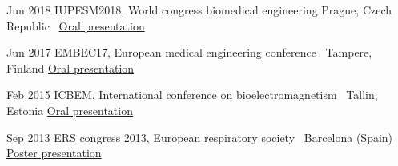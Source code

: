 \documentclass[letterpaper]{twentysecondcv} %
\begin{document}
\begin{twenty} %

	\twentyitem
    	{Jun 2018}
        {IUPESM2018, World congress biomedical engineering}
        {}
        {Prague, Czech Republic \hfill
          { \ \href{https://www.slideshare.net/slideshow/embed_code/key/z0l5pXuzNVj5EG}{Oral presentation}}
        }
        {}
        

	\twentyitem
    	{Jun 2017}
        {EMBEC17, European medical engineering conference~\cite{nlpf}}
        {}
        {Tampere, Finland   \hfill 
        	\href{https://www.slideshare.net/slideshow/embed_code/key/34qLaFcP2gR6ji}{Oral presentation}
        }
        {}
       

	\twentyitem
    	{Feb 2015}
        {ICBEM, International conference on bioelectromagnetism~\cite{iosc}}
        {}
        {Tallin, Estonia \hfill
			\href{https://www.slideshare.net/slideshow/embed_code/key/bRO5NrltJZFizD}{Oral presentation}        
        }
        {}
       

	\twentyitem
    	{Sep 2013}
        {ERS congress 2013, European respiratory society~\cite{iosers}}
        {}
        {Barcelona (Spain) \hfill
			\href{http://www.ers-education.org/Media/Media.aspx?idMedia=228641}{Poster presentation}        
        }
        {}
        
\end{twenty}    

      
        




\end{document}
